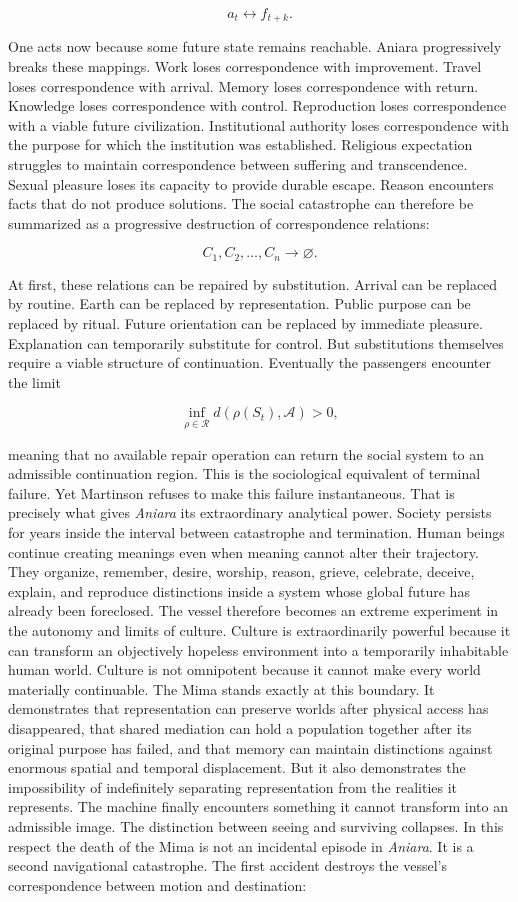 \documentclass[11pt,oneside]{book}
\theoremstyle{definition}
\theoremstyle{remark}
\begin{document}
\[
a_t \leftrightarrow f_{t+k}.
\]

One acts now because some future state remains reachable. Aniara progressively breaks these
mappings. Work loses correspondence with improvement. Travel loses correspondence with arrival.
Memory loses correspondence with return. Knowledge loses correspondence with control. Reproduction
loses correspondence with a viable future civilization. Institutional authority loses correspondence
with the purpose for which the institution was established. Religious expectation struggles to
maintain correspondence between suffering and transcendence. Sexual pleasure loses its capacity to
provide durable escape. Reason encounters facts that do not produce solutions. The social
catastrophe can therefore be summarized as a progressive destruction of correspondence relations:

\[
C_1,C_2,\ldots,C_n \longrightarrow \varnothing.
\]

At first, these relations can be repaired by substitution. Arrival can be replaced by routine. Earth
can be replaced by representation. Public purpose can be replaced by ritual. Future orientation can
be replaced by immediate pleasure. Explanation can temporarily substitute for control. But
substitutions themselves require a viable structure of continuation. Eventually the passengers
encounter the limit

\[
\inf_{\rho\in\mathcal{R}} d\!\left( \rho(S_t),\mathcal{A} \right) >0,
\]

meaning that no available repair operation can return the social system to an admissible
continuation region. This is the sociological equivalent of terminal failure. Yet Martinson refuses
to make this failure instantaneous. That is precisely what gives \emph{Aniara} its extraordinary
analytical power. Society persists for years inside the interval between catastrophe and
termination. Human beings continue creating meanings even when meaning cannot alter their
trajectory. They organize, remember, desire, worship, reason, grieve, celebrate, deceive, explain,
and reproduce distinctions inside a system whose global future has already been foreclosed. The
vessel therefore becomes an extreme experiment in the autonomy and limits of culture. Culture is
extraordinarily powerful because it can transform an objectively hopeless environment into a
temporarily inhabitable human world. Culture is not omnipotent because it cannot make every world
materially continuable. The Mima stands exactly at this boundary. It demonstrates that
representation can preserve worlds after physical access has disappeared, that shared mediation can
hold a population together after its original purpose has failed, and that memory can maintain
distinctions against enormous spatial and temporal displacement. But it also demonstrates the
impossibility of indefinitely separating representation from the realities it represents. The
machine finally encounters something it cannot transform into an admissible image. The distinction
between seeing and surviving collapses. In this respect the death of the Mima is not an incidental
episode in \emph{Aniara}. It is a second navigational catastrophe. The first accident destroys the
vessel's correspondence between motion and destination:
\end{document}
